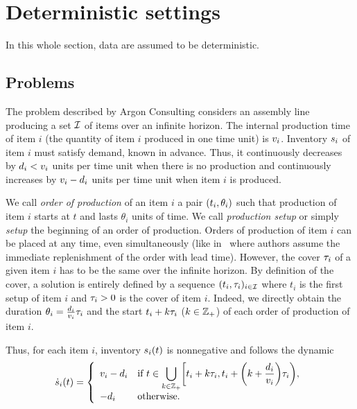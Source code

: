 \section{Deterministic settings}
\label{sec:lot-size:single-line:deterministic}

In this whole section, data are assumed to be deterministic.


\subsection{Problems}
\label{sec:lot-size:single-line:deterministic:problems}

The problem described by Argon Consulting considers an assembly line producing a set $\mathcal{I}$ of items over an infinite horizon.
The internal production time of item $i$ (\ie the quantity of item $i$ produced in one time unit) is $v_i$.
Inventory $s_i$ of item $i$ must satisfy demand, known in advance.
Thus, it continuously decreases by $d_i<v_i$ units per time unit when there is no production and continuously increases by $v_i-d_i$ units per time unit when item $i$ is produced.


We call \emph{order of production} of an item $i$ a pair $\bracket{t_i,\theta_i}$ such that production of item $i$ starts at $t$ and lasts $\theta_i$ units of time.
We call \emph{production setup} or simply \emph{setup} the beginning of an order of production.
Orders of production of item $i$ can be placed at any time, even simultaneously (like in~\cite{Ohno2001} where authors assume the immediate replenishment of the order with lead time).
However, the cover $\tau_i$ of a given item $i$ has to be the same over the infinite horizon.
By definition of the cover, a solution is entirely defined by a sequence $\bracket{t_i,\cover_i}_{i\in\REF}$ where $t_i$ is the first setup of item $i$ and $\tau_i>0$ is the cover of item $i$.
Indeed, we directly obtain the duration $\theta_i=\frac{d_i}{v_i}\tau_i$ and the start $t_i+k\tau_i$ ($k\in\mathbb{Z}_+$) of each order of production of item $i$.

Thus, for each item $i$, inventory $\inventory_i\bracket{t}$ is nonnegative and follows the dynamic
\begin{equation}\label{eq:lot-size:single-line:deterministic:motivations:dynamic}
  \dot{\inventory}_i\bracket{t} =
  \left\{
  \begin{array}{ll}
  \rate_i-\demand_i
  & \ds\mbox{if}\ t\in\bigcup_{k\in\ZZ_+} \left[t_i+k\cover_i,t_i+\bracket{k+\frac{\demand_i}{\rate_i}}\cover_i\right),
  \\
  -\demand_i
  & \mbox{otherwise}.
  \end{array}
  \right.
\end{equation}

